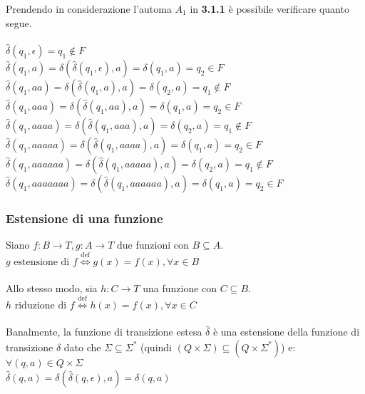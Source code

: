 \documentclass[]{article}
\begin{document}
Prendendo in considerazione l'automa \mbox{$A_1$} in \textbf{3.1.1} è possibile verificare quanto segue.
\\
\\
\mbox{$ \hat\delta(q_1, \epsilon) = q_1 \not\in F $}
\\
\mbox{$ \hat\delta(q_1, a) = \delta( \hat\delta(q_1, \epsilon) , a) = \delta( q_1 , a) = q_2 \in F $}
\\
\mbox{$ \hat\delta(q_1, aa) = \delta( \hat\delta(q_1, a) , a) = \delta( q_2 , a) = q_1 \not\in F $}
\\
\mbox{$ \hat\delta(q_1, aaa) = \delta( \hat\delta(q_1, aa) , a) = \delta( q_1 , a) = q_2 \in F $}
\\
\mbox{$ \hat\delta(q_1, aaaa) = \delta( \hat\delta(q_1, aaa) , a) = \delta( q_2 , a) = q_1 \not\in F $}
\\
\mbox{$ \hat\delta(q_1, aaaaa) = \delta( \hat\delta(q_1, aaaa) , a) = \delta( q_1 , a) = q_2 \in F $}
\\
\mbox{$ \hat\delta(q_1, aaaaaa) = \delta( \hat\delta(q_1, aaaaa) , a) = \delta( q_2 , a) = q_1 \not\in F $}
\\
\mbox{$ \hat\delta(q_1, aaaaaaa) = \delta( \hat\delta(q_1, aaaaaa) , a) = \delta( q_1 , a) = q_2 \in F $}



\subsubsection{Estensione di una funzione}

Siano \mbox{$f \colon B \to T, g \colon A \to T$} due funzioni con \mbox{$ B \subseteq A $}.
\\
\mbox{$ g \text{ estensione di } f \overset{\text{def}}{\Leftrightarrow} g(x) = f(x), \forall x \in B $}
\\
\\
Allo stesso modo, sia \mbox{$h \colon C \to T$} una funzione con \mbox{$ C \subseteq B $}.
\\
\mbox{$ h \text{ riduzione di } f \overset{\text{def}}{\Leftrightarrow} h(x) = f(x), \forall x \in C $}
\\
\\
Banalmente, la funzione di transizione estesa \mbox{$ \hat\delta $} è una estensione della funzione di
transizione \mbox{$ \delta $} dato che \mbox{$ \Sigma \subseteq \Sigma^* $}
(quindi \mbox{$ (Q \times \Sigma) \subseteq (Q \times \Sigma^*) $}) e:
\\
\mbox{$ \forall (q, a) \in Q \times \Sigma $}
\\
\mbox{$ \hat\delta(q, a) = \delta(\hat\delta(q, \epsilon), a) = \delta(q, a) $}
\end{document}
